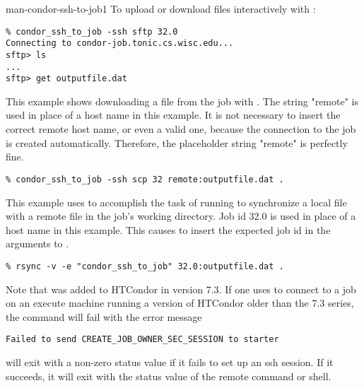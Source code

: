 \begin{ManPage}{}{man-condor-ssh-to-job}{1}
To upload or download files interactively with :
\footnotesize
\begin{verbatim}
% condor_ssh_to_job -ssh sftp 32.0
Connecting to condor-job.tonic.cs.wisc.edu...
sftp> ls
...
sftp> get outputfile.dat
\end{verbatim}
\normalsize

This example shows downloading a file from the job with .
The string "remote" is used in place of a host name in this example.
It is not necessary to insert the correct remote host name, or even
a valid one, because the connection to the job is created automatically.
Therefore, the placeholder string "remote" is perfectly fine.
\footnotesize
\begin{verbatim}
% condor_ssh_to_job -ssh scp 32 remote:outputfile.dat .
\end{verbatim}
\normalsize

This example uses  to accomplish the
task of running  to synchronize a local file with
a remote file in the job's working directory.
Job id 32.0 is used in place of a host name in this example.
This causes  to insert the expected job id in the
arguments to .
\footnotesize
\begin{verbatim}
% rsync -v -e "condor_ssh_to_job" 32.0:outputfile.dat .
\end{verbatim}
\normalsize

Note that  was added to HTCondor in version 7.3.  
If  one uses  to connect to a job
on an execute machine running a version of HTCondor older than the 7.3 series,
the command will fail with the error message
\begin{verbatim}
Failed to send CREATE_JOB_OWNER_SEC_SESSION to starter
\end{verbatim}

\ExitStatus

 will exit with a non-zero status value if it fails
to set up an ssh session.  If it succeeds, it will exit with the
status value of the remote command or shell.

\end{ManPage}
